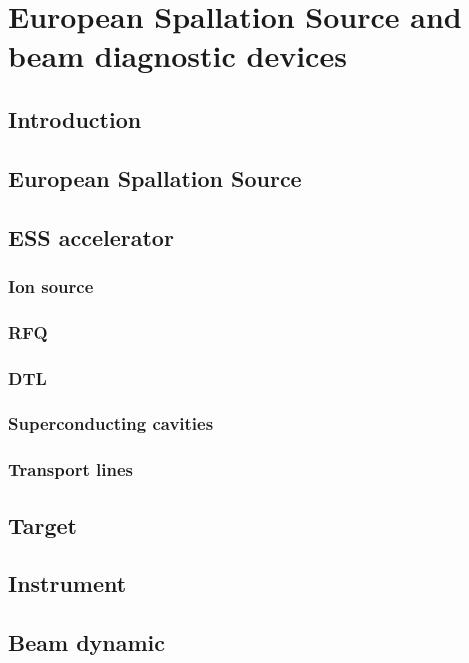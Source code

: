\chapter{European Spallation Source and beam diagnostic devices}
\cleardoublepage

\minitoc
\section{Introduction}
\begin{refsection}
	\label{ch2:Introduction}
  \section{European Spallation Source}
  

  \section{ESS accelerator}
  
  
  
	\subsection{Ion source}
	\subsection{RFQ}
	\subsection{DTL}
	\subsection{Superconducting cavities}
	\subsection{Transport lines}
	\section{Target}
	\section{Instrument}

  \section{Beam dynamic}


\end{refsection}
